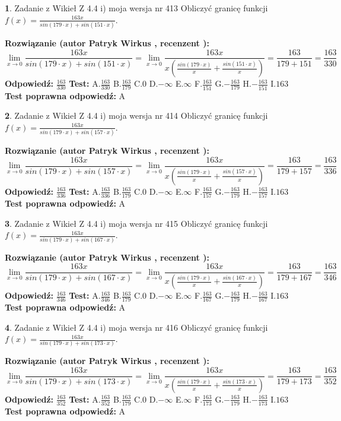 \documentclass[12pt, a4paper]{article}
\theoremstyle{definition} %
\newtheorem{zad}{}
\newcommand{\zadStart}[1]{\begin{zad}#1\newline}
\newcommand{\zadStop}{\end{zad}}
\newcommand{\rozwStart}[2]{\noindent \textbf{Rozwiązanie (autor #1 , recenzent #2): }\newline}
\newcommand{\rozwStop}{\newline}
\newcommand{\odpStart}{\noindent \textbf{Odpowiedź:}\newline}
\newcommand{\odpStop}{\newline}
\newcommand{\testStart}{\noindent \textbf{Test:}\newline}
\newcommand{\testStop}{\newline}
\newcommand{\kluczStart}{\noindent \textbf{Test poprawna odpowiedź:}\newline}
\newcommand{\kluczStop}{\newline}
\begin{document}
\zadStart{Zadanie z Wikieł Z 4.4 i) moja wersja nr 413}
Obliczyć granicę funkcji $f(x)=\frac{163x}{sin(179\cdot x) +sin(151\cdot x)}$.
\zadStop
\rozwStart{Patryk Wirkus}{}
$$\lim\limits_{x\to 0}\frac{163x}{sin(179\cdot x) +sin(151\cdot x)}=\lim\limits_{x\to 0}\frac{163x}{x(\frac{sin(179\cdot x)}{x}+\frac{sin(151\cdot x)}{x})}=\frac{163}{179+151} = \frac{163}{330}$$
\rozwStop
\odpStart
$\frac{163}{330}$
\odpStop
\testStart
A.$\frac{163}{330}$
B.$\frac{163}{179}$
C.$0$
D.$-\infty$
E.$\infty$
F.$\frac{163}{151}$
G.$-\frac{163}{179}$
H.$-\frac{163}{151}$
I.$163$
\testStop
\kluczStart
A
\kluczStop



\zadStart{Zadanie z Wikieł Z 4.4 i) moja wersja nr 414}
Obliczyć granicę funkcji $f(x)=\frac{163x}{sin(179\cdot x) +sin(157\cdot x)}$.
\zadStop
\rozwStart{Patryk Wirkus}{}
$$\lim\limits_{x\to 0}\frac{163x}{sin(179\cdot x) +sin(157\cdot x)}=\lim\limits_{x\to 0}\frac{163x}{x(\frac{sin(179\cdot x)}{x}+\frac{sin(157\cdot x)}{x})}=\frac{163}{179+157} = \frac{163}{336}$$
\rozwStop
\odpStart
$\frac{163}{336}$
\odpStop
\testStart
A.$\frac{163}{336}$
B.$\frac{163}{179}$
C.$0$
D.$-\infty$
E.$\infty$
F.$\frac{163}{157}$
G.$-\frac{163}{179}$
H.$-\frac{163}{157}$
I.$163$
\testStop
\kluczStart
A
\kluczStop



\zadStart{Zadanie z Wikieł Z 4.4 i) moja wersja nr 415}
Obliczyć granicę funkcji $f(x)=\frac{163x}{sin(179\cdot x) +sin(167\cdot x)}$.
\zadStop
\rozwStart{Patryk Wirkus}{}
$$\lim\limits_{x\to 0}\frac{163x}{sin(179\cdot x) +sin(167\cdot x)}=\lim\limits_{x\to 0}\frac{163x}{x(\frac{sin(179\cdot x)}{x}+\frac{sin(167\cdot x)}{x})}=\frac{163}{179+167} = \frac{163}{346}$$
\rozwStop
\odpStart
$\frac{163}{346}$
\odpStop
\testStart
A.$\frac{163}{346}$
B.$\frac{163}{179}$
C.$0$
D.$-\infty$
E.$\infty$
F.$\frac{163}{167}$
G.$-\frac{163}{179}$
H.$-\frac{163}{167}$
I.$163$
\testStop
\kluczStart
A
\kluczStop



\zadStart{Zadanie z Wikieł Z 4.4 i) moja wersja nr 416}
Obliczyć granicę funkcji $f(x)=\frac{163x}{sin(179\cdot x) +sin(173\cdot x)}$.
\zadStop
\rozwStart{Patryk Wirkus}{}
$$\lim\limits_{x\to 0}\frac{163x}{sin(179\cdot x) +sin(173\cdot x)}=\lim\limits_{x\to 0}\frac{163x}{x(\frac{sin(179\cdot x)}{x}+\frac{sin(173\cdot x)}{x})}=\frac{163}{179+173} = \frac{163}{352}$$
\rozwStop
\odpStart
$\frac{163}{352}$
\odpStop
\testStart
A.$\frac{163}{352}$
B.$\frac{163}{179}$
C.$0$
D.$-\infty$
E.$\infty$
F.$\frac{163}{173}$
G.$-\frac{163}{179}$
H.$-\frac{163}{173}$
I.$163$
\testStop
\kluczStart
A
\kluczStop
\end{document}
